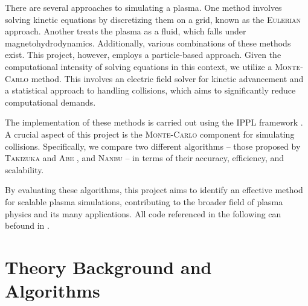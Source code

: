 There are several approaches to simulating a plasma. One method involves solving kinetic equations by discretizing them on a grid, known as the \textsc{Eulerian} approach. Another treats the plasma as a fluid, which falls under magnetohydrodynamics. Additionally, various combinations of these methods exist. This project, however, employs a particle-based approach. Given the computational intensity of solving equations in this context, we utilize a \textsc{Monte-Carlo} method. This involves an electric field solver for kinetic advancement and a statistical approach to handling collisions, which aims to significantly reduce computational demands.

The implementation of these methods is carried out using the IPPL framework \cite{muralikrishnan2024scaling}. A crucial aspect of this project is the \textsc{Monte-Carlo} component for simulating collisions. Specifically, we compare two different algorithms -- those proposed by \textsc{Takizuka} and \textsc{Abe} \cite{TakizukaAbe1977}, and \textsc{Nanbu} \cite{Nanbu1997} -- in terms of their accuracy, efficiency, and scalability.

By evaluating these algorithms, this project aims to identify an effective method for scalable plasma simulations, contributing to the broader field of plasma physics and its many applications. All code referenced in the following can befound in \cite{aliemen2024}.


\section{Theory Background and Algorithms}




